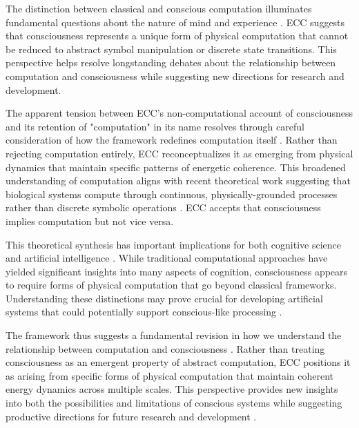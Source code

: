 The distinction between classical and conscious computation illuminates fundamental questions about the nature of mind and experience \cite{Chalmers2011}. ECC suggests that consciousness represents a unique form of physical computation that cannot be reduced to abstract symbol manipulation or discrete state transitions. This perspective helps resolve longstanding debates about the relationship between computation and consciousness while suggesting new directions for research and development.

The apparent tension between ECC's non-computational account of consciousness and its retention of "computation" in its name resolves through careful consideration of how the framework redefines computation itself \cite{MacLennan2004}. Rather than rejecting computation entirely, ECC reconceptualizes it as emerging from physical dynamics that maintain specific patterns of energetic coherence. This broadened understanding of computation aligns with recent theoretical work suggesting that biological systems compute through continuous, physically-grounded processes rather than discrete symbolic operations \cite{Siegelmann2003}. ECC accepts that consciousness implies computation but not vice versa.

This theoretical synthesis has important implications for both cognitive science and artificial intelligence \cite{Deutsch2011}. While traditional computational approaches have yielded significant insights into many aspects of cognition, consciousness appears to require forms of physical computation that go beyond classical frameworks. Understanding these distinctions may prove crucial for developing artificial systems that could potentially support conscious-like processing \cite{Aaronson2013}.

The framework thus suggests a fundamental revision in how we understand the relationship between computation and consciousness \cite{Wheeler1990}. Rather than treating consciousness as an emergent property of abstract computation, ECC positions it as arising from specific forms of physical computation that maintain coherent energy dynamics across multiple scales. This perspective provides new insights into both the possibilities and limitations of conscious systems while suggesting productive directions for future research and development \cite{Landauer1996}.